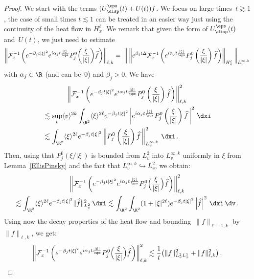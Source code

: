 \begin{proof}
We start with the terms $(U^\eps_{\disp}(t)+U(t))f$. We focus on large times~$t \gtrsim 1$, the case of small times $t \lesssim 1$ can be treated in an easier way just using the continuity of the heat flow in $H^\ell_x$. We remark that given the form of $U^\eps_{\disp}(t)$ and~$U(t)$, we just need to estimate
\[
\left\| \mathcal{F}_x^{-1} \left(e^{-\beta_j t|\xi|^2} e^{i \alpha_j t \frac{|\xi|}{\eps}} P^0_j{\left(\frac{\xi}{|\xi|} \right)} \widehat f \right) \right\|_{\ell,k} 
= \;\bigg\| \left\| e^{\beta_j t \Delta} \mathcal{F}_x^{-1} \left(e^{i \alpha_j t \frac{|\xi|}{\eps}} P^0_j\left(\frac{\xi}{|\xi|} \right) \widehat f \right)\right\|_{H^\ell_x} \bigg\|_{L^{\infty,k}_v}
\]
with $\alpha_j \in \R$ (and can be~0) and $\beta_j>0$. We have
\begin{multline*}
\left\| \mathcal{F}_x^{-1} \left(e^{-\beta_j t|\xi|^2} e^{i \alpha_j t \frac{|\xi|}{\eps}} P^0_j \left(\frac{\xi}{|\xi|} \right) \widehat f \right) \right\|^2_{\ell,k} \\
\begin{aligned}
& \lesssim \sup_v \langle v \rangle^{2k} \int_{\R^2} \langle \xi \rangle^{2\ell} e^{-\beta_j t|\xi|^2} \left| e^{i \alpha_j t \frac{|\xi|}{\eps}} P^0_j\left(\frac{\xi}{|\xi|} \right) \widehat f\,\right|^2 \, \dxi \\
&\lesssim \int_{\R^2} \langle \xi \rangle^{2\ell}e^{-\beta_j t|\xi|^2} \left\|P^0_j\left(\frac{\xi}{|\xi|} \right) \widehat f\, \right\|^2_{L^{\infty,k}_v} \, \dxi \,.
\end{aligned}
\end{multline*}
Then, using that $P_{j}^0(\xi/|\xi|)$ is bounded from $L^2_v$ into $L^{\infty,k}_v$ uniformly in $\xi$ from Lemma~\ref{EllisPinsky} and the fact that $L^{\infty,k}_v \hookrightarrow L^2_v$, we obtain:
\begin{multline*}
\left\| \mathcal{F}_x^{-1} \left(e^{-\beta_j t|\xi|^2} e^{i \alpha_j t \frac{|\xi|}{\eps}} P^0_j\Big(\frac{\xi}{|\xi|} \Big) \widehat f \right) \right\|_{\ell,k}^2 \\
\lesssim \int_{\R^2} \langle \xi \rangle^{2\ell} e^{-\beta_j t|\xi|^2} \| \widehat f \|^2_{L^2_v} \, \dxi \lesssim \int_{\R^2}
\int_{\R^2} (1+|\xi|^{2\ell}) e^{-\beta_j t|\xi|^2} \left|\widehat f\right|^2\, \dxi \, \dv \,.
\end{multline*}
Using now the decay properties of the heat flow and bounding~$ \|f\| _{\ell-1,k} $ by~$ \|f\| _{\ell,k}$, we get:
\[
\left\| \mathcal{F}_x^{-1} \left(e^{-\beta_j t|\xi|^2} e^{i \alpha_j t \frac{|\xi|}{\eps}} P^0_j\Big(\frac{\xi}{|\xi| }\Big) \widehat f \right) \right\|_{\ell,k}^2 \lesssim \frac{1}{t} \big(\|f\|^2_{L^2_v L^1_x} + \|f\|^2_{\ell,k}\big) \,.
\]
\end{proof}
